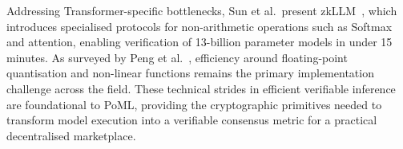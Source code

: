 Addressing Transformer-specific bottlenecks, Sun et al.\ present zkLLM~\cite{sun2024zkllm}, which introduces specialised protocols for non-arithmetic operations such as Softmax and attention, enabling verification of 13-billion parameter models in under 15 minutes. As surveyed by Peng et al.~\cite{peng2025survey}, efficiency around floating-point quantisation and non-linear functions remains the primary implementation challenge across the field. These technical strides in efficient verifiable inference are foundational to PoML, providing the cryptographic primitives needed to transform model execution into a verifiable consensus metric for a practical decentralised marketplace.
